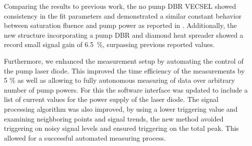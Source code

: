 Comparing the results to previous work, the no pump DBR VECSEL showed consistency in the fit parameters and demonstrated a similar constant behavior between saturation fluence and pump power as reported in \cite{Gaulke2021HighCharacterization}. Additionally, the new structure incorporating a pump DBR and diamond heat spreader showed a record small signal gain of \qty{6.5}{\percent}, surpassing previous reported values.

Furthermore, we enhanced the measurement setup by automating the control of the pump laser diode. This improved the time efficiency of the measurements by 5 \% as well as allowing to fully autonomous measuring of data over arbitrary number of pump powers. For this the software interface was updated to include a list of current values for the power supply of the laser diode. The signal processing algorithm was also improved,  by using a lower triggering value and examining neighboring points and signal trends, the new method avoided triggering on noisy signal levels and ensured triggering on the total peak. This allowed for a successful automated measuring process. 